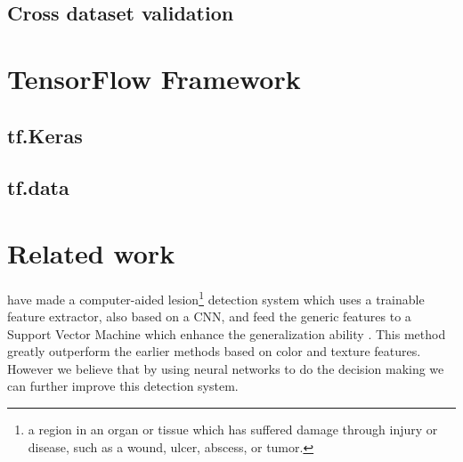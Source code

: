 \documentclass[thesis.tex]{subfiles}
\begin{document}
\subsection{Cross dataset validation}






\section{TensorFlow Framework} 


\subsection{tf.Keras}


\subsection{tf.data}




\section{Related work} \label{relatedwork}
%
\citeauthor*{LesionDetection15} have made a computer-aided lesion\footnote{a region in an organ or tissue which has suffered damage through injury or disease, such as a wound, ulcer, abscess, or tumor.} detection system which uses a trainable feature extractor, also based on a CNN, and feed the generic features to a Support Vector Machine which enhance the generalization ability \cite{LesionDetection15}. This method greatly outperform the earlier methods based on color and texture features. However we believe that by using neural networks to do the decision making we can further improve this detection system. 
\end{document}

